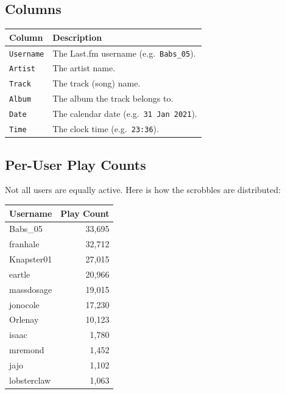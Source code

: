 \documentclass[12pt, a4paper]{article}
\begin{document}
\subsection{Columns}

\begin{center}
\begin{tabular}{lp{9cm}}
    \toprule
    \textbf{Column} & \textbf{Description} \\
    \midrule
    \texttt{Username} & The Last.fm username (e.g.\ \texttt{Babs\_05}). \\
    \texttt{Artist}   & The artist name. \\
    \texttt{Track}    & The track (song) name. \\
    \texttt{Album}    & The album the track belongs to. \\
    \texttt{Date}     & The calendar date (e.g.\ \texttt{31 Jan 2021}). \\
    \texttt{Time}     & The clock time (e.g.\ \texttt{23:36}). \\
    \bottomrule
\end{tabular}
\end{center}

\subsection{Per-User Play Counts}
Not all users are equally active. Here is how the scrobbles are distributed:

\begin{center}
\begin{tabular}{lr}
    \toprule
    \textbf{Username} & \textbf{Play Count} \\
    \midrule
    Babs\_05     & 33{,}695 \\
    franhale     & 32{,}712 \\
    Knapster01   & 27{,}015 \\
    eartle       & 20{,}966 \\
    massdosage   & 19{,}015 \\
    jonocole     & 17{,}230 \\
    Orlenay      & 10{,}123 \\
    isaac        & 1{,}780  \\
    mremond      & 1{,}452  \\
    jajo         & 1{,}102  \\
    lobsterclaw  & 1{,}063  \\
    \bottomrule
\end{tabular}
\end{center}
\end{document}
